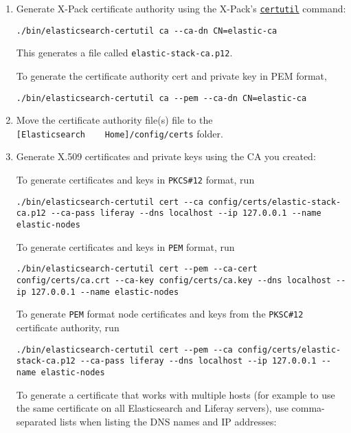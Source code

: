 \begin{enumerate}
\def\labelenumi{\arabic{enumi}.}
\item
  Generate X-Pack certificate authority using the X-Pack's
  \href{https://www.elastic.co/guide/en/elasticsearch/reference/7.x/certutil.html}{\texttt{certutil}}
  command:

\begin{verbatim}
./bin/elasticsearch-certutil ca --ca-dn CN=elastic-ca
\end{verbatim}

  This generates a file called \texttt{elastic-stack-ca.p12}.

  To generate the certificate authority cert and private key in PEM
  format,

\begin{verbatim}
./bin/elasticsearch-certutil ca --pem --ca-dn CN=elastic-ca
\end{verbatim}
\item
  Move the certificate authority file(s) file to the
  \texttt{{[}Elasticsearch\ \ \ \ Home{]}/config/certs} folder.
\item
  Generate X.509 certificates and private keys using the CA you created:

  To generate certificates and keys in \texttt{PKCS\#12} format, run

\begin{verbatim}
./bin/elasticsearch-certutil cert --ca config/certs/elastic-stack-ca.p12 --ca-pass liferay --dns localhost --ip 127.0.0.1 --name elastic-nodes
\end{verbatim}

  To generate certificates and keys in \texttt{PEM} format, run

\begin{verbatim}
./bin/elasticsearch-certutil cert --pem --ca-cert config/certs/ca.crt --ca-key config/certs/ca.key --dns localhost --ip 127.0.0.1 --name elastic-nodes
\end{verbatim}

  To generate \texttt{PEM} format node certificates and keys from the
  \texttt{PKSC\#12} certificate authority, run

\begin{verbatim}
./bin/elasticsearch-certutil cert --pem --ca config/certs/elastic-stack-ca.p12 --ca-pass liferay --dns localhost --ip 127.0.0.1 --name elastic-nodes
\end{verbatim}

  To generate a certificate that works with multiple hosts (for example
  to use the same certificate on all Elasticsearch and Liferay servers),
  use comma-separated lists when listing the DNS names and IP addresses:


\end{enumerate}

